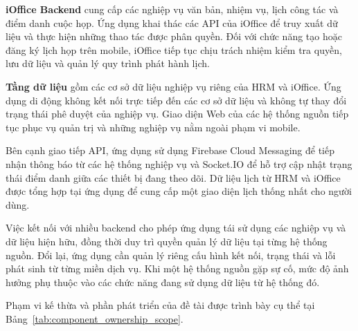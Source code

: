 \textbf{iOffice Backend} cung cấp các nghiệp vụ văn bản, nhiệm vụ, lịch công tác và điểm danh cuộc họp. Ứng dụng khai thác các API của iOffice để truy xuất dữ liệu và thực hiện những thao tác được phân quyền. Đối với chức năng tạo hoặc đăng ký lịch họp trên mobile, iOffice tiếp tục chịu trách nhiệm kiểm tra quyền, lưu dữ liệu và quản lý quy trình phát hành lịch.

\textbf{Tầng dữ liệu} gồm các cơ sở dữ liệu nghiệp vụ riêng của HRM và iOffice. Ứng dụng di động không kết nối trực tiếp đến các cơ sở dữ liệu và không tự thay đổi trạng thái phê duyệt của nghiệp vụ. Giao diện Web của các hệ thống nguồn tiếp tục phục vụ quản trị và những nghiệp vụ nằm ngoài phạm vi mobile.

Bên cạnh giao tiếp API, ứng dụng sử dụng Firebase Cloud Messaging để tiếp nhận thông báo từ các hệ thống nghiệp vụ và Socket.IO để hỗ trợ cập nhật trạng thái điểm danh giữa các thiết bị đang theo dõi. Dữ liệu lịch từ HRM và iOffice được tổng hợp tại ứng dụng để cung cấp một giao diện lịch thống nhất cho người dùng.

Việc kết nối với nhiều backend cho phép ứng dụng tái sử dụng các nghiệp vụ và dữ liệu hiện hữu, đồng thời duy trì quyền quản lý dữ liệu tại từng hệ thống nguồn. Đổi lại, ứng dụng cần quản lý riêng cấu hình kết nối, trạng thái và lỗi phát sinh từ từng miền dịch vụ. Khi một hệ thống nguồn gặp sự cố, mức độ ảnh hưởng phụ thuộc vào các chức năng đang sử dụng dữ liệu từ hệ thống đó.

Phạm vi kế thừa và phần phát triển của đề tài được trình bày cụ thể tại Bảng~\ref{tab:component_ownership_scope}.
